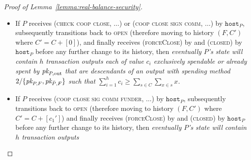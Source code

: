 \begin{proof}[Proof of Lemma~\ref{lemma:real-balance-security}]
\begin{itemize}
    change to its history, then \emph{eventually $P$'s \ledger state will
    contain $h$ transaction outputs each of value $c_i$ exclusively spendable or
    already spent by $\pk{P, \mathrm{out}}$ that are descendants of an output
    with spending method $2/\{\pk{P, F}, \pk{\bar{P}, F}\}$ such that
    $\sum\limits_{i=1}^h c_i \geq \sum\limits_{s \in C} \sum\limits_{x \in s}
    x$}. Furthermore, given that $P$ moves to the \textsc{open} state after the
    (\textsc{virtualising}, $\dots$) message and in case it sends
    (\textsc{funded}, $\dots$) to some party $R$
    (Fig.~\ref{code:ln:virtualise:start-end},
    l.~\ref{code:ln:virtualise:start-end:helper-output-funded}), the latter
    party is the (local, kindred) \texttt{fundee} of a new virtual channel. If
    subsequently the state of $R$ transitions to \textsc{open} (therefore
    obtaining history $(F_R, C_R)$ where $F_R = F + C$ and $C_R = [[0]]$), and
    finally receives (\textsc{forceClose}) by \environment and (\textsc{closed}) by
    $\texttt{host}_R$ ($\texttt{host}_R = \texttt{host}_P$ --
    Fig.~\ref{code:ln:bob}, l.~\ref{code:ln:bob:host}) before any further change
    to its history, then \emph{eventually $R$'s \ledger state will contain an
    output with a $2/\{\pk{R, F}, \pk{\bar{R}, F}\}$ spending method.}
    \item If $P$ receives (\textsc{check coop close}, $\dots$) or (\textsc{coop
    close sign comm}, $\dots$) by $\texttt{host}_P$, subsequently transitions
    back to \textsc{open} (therefore moving to history $(F, C')$ where $C' = C +
    [0]$), and finally receives (\textsc{forceClose}) by \environment and
    (\textsc{closed}) by $\texttt{host}_P$ before any further change to its
    history, then \emph{eventually $P$'s \ledger state will contain $h$
    transaction outputs each of value $c_i$ exclusively spendable or already
    spent by $\pk{P, \mathrm{out}}$ that are descendants of an output with
    spending method $2/\{\pk{P, F}, \pk{\bar{P}, F}\}$ such that
    $\sum\limits_{i=1}^h c_i \geq \sum\limits_{s \in C} \sum\limits_{x \in s}
    x$.}
    \item If $P$ receives (\textsc{coop close sig comm funder}, $\dots$) by
    $\texttt{host}_P$, subsequently transitions back to \textsc{open} (therefore
    moving to history $(F, C')$ where $C' = C + [c_1']$) and finally receives
    (\textsc{forceClose}) by \environment and (\textsc{closed}) by
    $\texttt{host}_P$ before any further change to its history, then
    \emph{eventually $P$'s \ledger state will contain $h$ transaction outputs
}
\end{itemize}
\end{proof}
